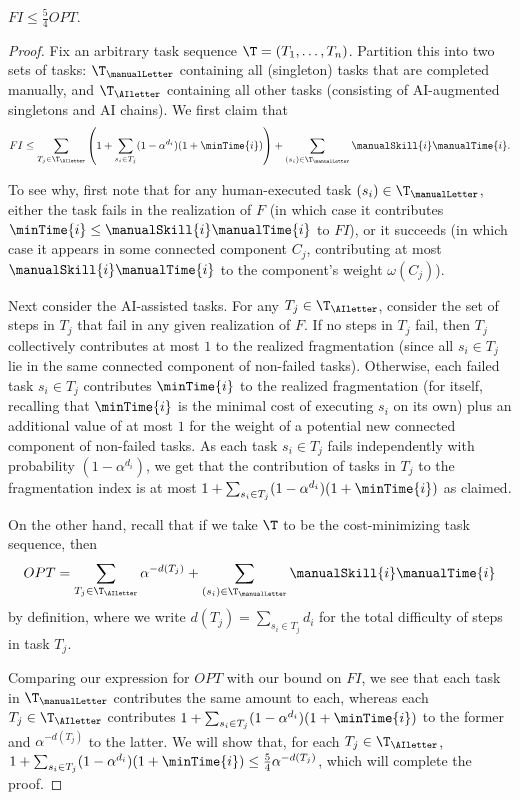 \begin{proposition}
\label{prop:FI.upper.bound}
    $FI \leq \tfrac{5}{4}OPT$.
\end{proposition}
\begin{proof}
Fix an arbitrary task sequence $\T = (T_1, \dotsc, T_n)$.  
Partition this into two sets of tasks: $\T_{\manualLetter}$ containing all (singleton) tasks that are completed manually, and $\T_{\AIletter}$ containing all other tasks (consisting of AI-augmented singletons and AI chains).  
We first claim that 
\[ FI \leq \sum_{T_j \in \T_{\AIletter}}\left(1 + \sum_{s_i \in T_j}(1-\alpha^{d_i})(1+\minTime{i})\right) + \sum_{(s_i) \in \T_{\manualLetter}}\manualSkill{i}\manualTime{i}. \]

To see why, first note that for any human-executed task $(s_i) \in \T_{\manualLetter}$, either the task fails in the realization of $F$ (in which case it contributes $\minTime{i} \leq \manualSkill{i}\manualTime{i}$ to $FI$), or it succeeds (in which case it appears in some connected component $C_j$, contributing at most $\manualSkill{i}\manualTime{i}$ to the component's weight $\omega(C_j)$).

Next consider the AI-assisted tasks.  
For any $T_j \in \T_{\AIletter}$, consider the set of steps in $T_j$ that fail in any given realization of $F$. 
If no steps in $T_j$ fail, then $T_j$ collectively contributes at most $1$ to the realized fragmentation (since all $s_i \in T_j$ lie in the same connected component of non-failed tasks).  
Otherwise, each failed task $s_i \in T_j$ contributes $\minTime{i}$ to the realized fragmentation (for itself, recalling that $\minTime{i}$ is the minimal cost of executing $s_i$ on its own) plus an additional value of at most $1$ for the weight of a potential new connected component of non-failed tasks.  
As each task $s_i \in T_j$ fails independently with probability $(1-\alpha^{d_i})$, we get that the contribution of tasks in $T_j$ to the fragmentation index is at most $1 + \sum_{s_i \in T_j}(1-\alpha^{d_i})(1+\minTime{i})$ as claimed.

On the other hand, recall that if we take $\T$ to be the cost-minimizing task sequence, then
\[ OPT = \sum_{T_j \in \T_{\AIletter}} \alpha^{-d(T_j)} + \sum_{(s_i) \in \T_{\manualLetter}} \manualSkill{i}\manualTime{i} \] 
by definition, where we write $d(T_j) = \sum_{s_i \in T_j}d_i$ for the total difficulty of steps in task $T_j$.

Comparing our expression for $OPT$ with our bound on $FI$, we see that each task in $\T_{\manualLetter}$ contributes the same amount to each, whereas each $T_j \in \T_{\AIletter}$ contributes $1+\sum_{s_i \in T_j}(1-\alpha^{d_i})(1+\minTime{i})$ to the former and $\alpha^{-d(T_j)}$ to the latter.  
We will show that, for each $T_j \in \T_{\AIletter}$, $1 + \sum_{s_i \in T_j}(1-\alpha^{d_i})(1+\minTime{i}) \leq \frac{5}{4} \alpha^{-d(T_j)}$, which will complete the proof.


\end{proof}
